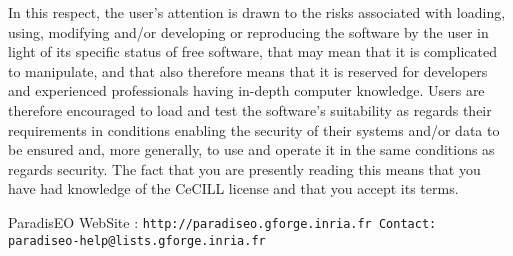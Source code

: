 In this respect, the user's attention is drawn to the risks associated with loading, using, modifying and/or developing or reproducing the software by the user in light of its specific status of free software, that may mean that it is complicated to manipulate, and that also therefore means that it is reserved for developers and experienced professionals having in-depth computer knowledge. Users are therefore encouraged to load and test the software's suitability as regards their requirements in conditions enabling the security of their systems and/or data to be ensured and, more generally, to use and operate it in the same conditions as regards security. The fact that you are presently reading this means that you have had knowledge of the Ce\-CILL license and that you accept its terms.

Paradis\-EO Web\-Site : \tt{http://paradiseo.gforge.inria.fr} Contact: \tt{paradiseo-help@lists.gforge.inria.fr} 